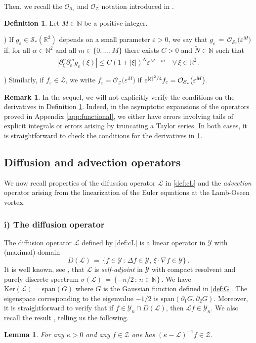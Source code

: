 \documentclass[11pt,reqno,a4paper]{amsart}
\def\eps{\varepsilon}
\def\e{{\rm e}}
\def\de{{\partial}}
\def\RR {\mathbb{R}}
\def\NN {\mathbb{N}}
\newcommand{\cL}{\mathcal{L}}
\newcommand{\cO}{\mathcal{O}}
\newcommand{\cS}{\mathcal{S}}
\newcommand{\cY}{\mathcal{Y}}
\newcommand{\cZ}{\mathcal{Z}}
\newcommand{\1}{\mathbbm{1}}
\newtheorem{lemma}[proposition]{Lemma}
\theoremstyle{definition}
\newtheorem{definition}[proposition]{Definition}
\newtheorem{remark}[proposition]{Remark}
\theoremstyle{definition}
\numberwithin{equation}{section}
\begin{document}
Then, we recall the $\cO_{\cS_*}$ and $\cO_\cZ$ notation introduced in \cite[Definition 3.4]{dolce2024long}.
\begin{definition}\label{def:topo}
Let $M \in \NN$ be a positive integer. 

\smallskip{})
If $g_\eps \in \cS_*(\RR^2)$ depends on a small parameter $\eps > 0$,
we say that $g_\eps \,=\, \cO_{\cS_*}\bigl(\eps^M\bigr)$ if, for all $\alpha \in \NN^2 $ and all $m\in \{0,\dots, M\}$ there exists $C>0$ and $\widetilde{N}\in \NN$ such that
\[
  |\partial^{\alpha}_\xi\de_\eps^mg_\eps(\xi)| \le C(1+|\xi|)^{\widetilde{N}}\eps^{M-m}
  \quad \forall\,\xi \in \RR^2\,.
\]

) Similarly, if $f_\eps \in \cZ$, we write $f_\eps = \cO_{\cZ}
\bigl(\eps^M\bigr)$ if $\e^{|\xi|^2/4}f_\eps = \cO_{\cS_*}\bigl(\eps^M\bigr)$. 
\end{definition}
\begin{remark}
    In the sequel, we will not explicitly verify the conditions on the derivatives in Definition \ref{def:topo}. Indeed, in the asymptotic expansions  of the operators proved in Appendix \ref{app:functional}, we either have errors involving tails of explicit integrals or errors arising by truncating a Taylor series. In both cases, it is straightforward to check the conditions for the derivatives in \cref{def:topo}.
\end{remark}
\subsection{Diffusion and advection operators}
We now recall properties of the difussion operator $\cL$ in \cref{def:cL} and the \emph{advection} operator arising from the linearization of the Euler equations at the Lamb-Oseen vortex.
\subsubsection*{{\rm i)} \textbf{The diffusion operator}} The diffusion operator $\cL$ defined by \cref{def:cL} is
a linear operator in $\cY$ with (maximal) domain
\begin{equation}\label{def:cLdom}
  D(\cL) \,=\, \bigl\{f\in \cY \, : \,\Delta f\in \cY, \, 
  \xi\cdot \nabla f \in \cY\bigr\}\,.
\end{equation}
It is well known, see \cite[Appendix~A]{GalWay2002}, that $\cL$ is {\em self-adjoint} in
$\cY$ with compact resolvent and purely discrete spectrum   $\sigma(\cL) \,=\, \{-n/2 \, : \, n\in \NN\}\,$. We have $\mathrm{Ker}(\cL)=\mathrm{span}(G)$ where $G$ is the Gaussian function defined in \cref{def:G}. The eigenspace corresponding to the eigenvalue $-1/2$ is $\mathrm{span}(\de_1G,\de_2G)$. Moreover, it is straightforward to verify that if $f \in \cY_n \cap D(\cL)$, then $\cL f \in \cY_n$. We also recall the result \cite[Lemma 3.5]{dolce2024long}, telling us the following.
\begin{lemma}\label{lem:Linvert}
For any $\kappa > 0$ and any $f \in \cZ$ one has $(\kappa - \cL)^{-1}f
\in \cZ$.   
\end{lemma}
\end{document}
